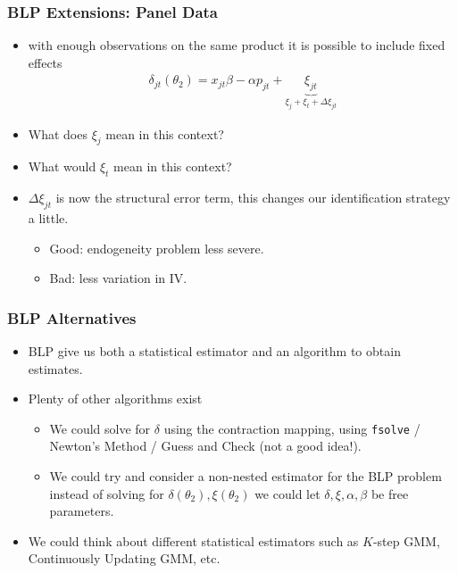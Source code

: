 \begin{frame}
\frametitle{BLP Extensions: Panel Data}
\begin{itemize}
\item with enough observations on the same product it is possible to include fixed effects
\begin{eqnarray*}
\delta_{jt}(\theta_2) = x_{jt} \beta - \alpha p_{jt} + \underbrace{\xi_{jt}}_{\xi_{j} + \xi_t + \Delta \xi_{jt}}
\end{eqnarray*}
\item What does $\xi_{j}$ mean in this context?
\item What would $\xi_t$ mean in this context?
\item $\Delta \xi_{jt}$ is now the structural error term, this changes our identification strategy a little. 
\begin{itemize}
\item Good: endogeneity problem less severe.
\item Bad: less variation in IV.
\end{itemize}
\end{itemize}
\end{frame}


 \begin{frame}
\frametitle{BLP Alternatives}
\begin{itemize}
 \item BLP give us both a statistical \alert{estimator} and an \alert{algorithm} to obtain estimates.
\item Plenty of other algorithms exist
\begin{itemize}
\item We could solve for $\delta$ using the contraction mapping, using \texttt{fsolve} / Newton's Method / Guess and Check (not a good idea!).
\item We could try and consider a non-nested estimator for the BLP problem instead of solving for $\delta(\theta_2),\xi(\theta_2)$ we could let $\delta,\xi,\alpha,\beta$ be free parameters.
 \end{itemize}
\item We could think about different statistical estimators such as $K$-step GMM, Continuously Updating GMM, etc.
 \end{itemize}
\end{frame}


